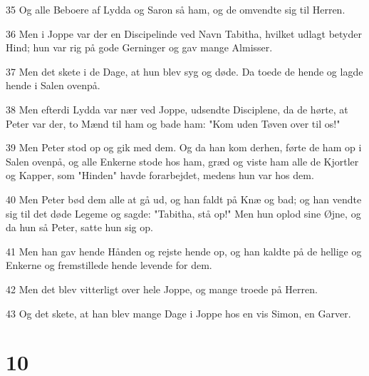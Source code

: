 \par 35 Og alle Beboere af Lydda og Saron så ham, og de omvendte sig til Herren.
\par 36 Men i Joppe var der en Discipelinde ved Navn Tabitha, hvilket udlagt betyder Hind; hun var rig på gode Gerninger og gav mange Almisser.
\par 37 Men det skete i de Dage, at hun blev syg og døde. Da toede de hende og lagde hende i Salen ovenpå.
\par 38 Men efterdi Lydda var nær ved Joppe, udsendte Disciplene, da de hørte, at Peter var der, to Mænd til ham og bade ham: "Kom uden Tøven over til os!"
\par 39 Men Peter stod op og gik med dem. Og da han kom derhen, førte de ham op i Salen ovenpå, og alle Enkerne stode hos ham, græd og viste ham alle de Kjortler og Kapper, som "Hinden" havde forarbejdet, medens hun var hos dem.
\par 40 Men Peter bød dem alle at gå ud, og han faldt på Knæ og bad; og han vendte sig til det døde Legeme og sagde: "Tabitha, stå op!" Men hun oplod sine Øjne, og da hun så Peter, satte hun sig op.
\par 41 Men han gav hende Hånden og rejste hende op, og han kaldte på de hellige og Enkerne og fremstillede hende levende for dem.
\par 42 Men det blev vitterligt over hele Joppe, og mange troede på Herren.
\par 43 Og det skete, at han blev mange Dage i Joppe hos en vis Simon, en Garver.

\chapter{10}

